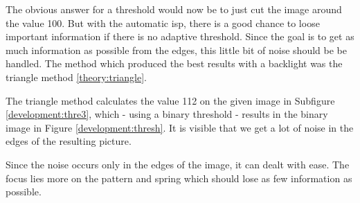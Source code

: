 The obvious answer for a threshold would now be to just cut the image around the value 100.
But with the automatic \acs{isp}, there is a good chance to loose important information if there is no adaptive threshold.
Since the goal is to get as much information as possible from the edges, this little bit of noise should be be handled.
The method which produced the best results with a backlight was the triangle method \ref{theory:triangle}.

The triangle method calculates the value 112 on the given image in Subfigure \ref{development:thre3}, which - using a binary threshold - results in the binary image in Figure \ref{development:thresh}.
It is visible that we get a lot of noise in the edges of the resulting picture.
\begin{center}
	\centering
	\label{development:thresh}
\end{center}
Since the noise occurs only in the edges of the image, it can dealt with ease.
The focus lies more on the pattern and spring which should lose as few information as possible.

